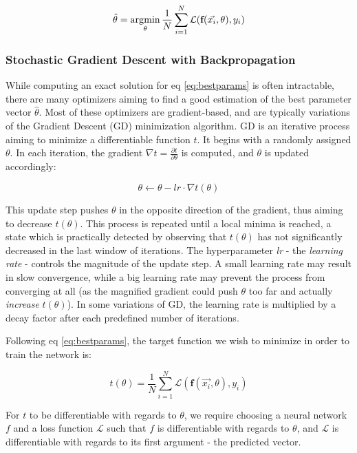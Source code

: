 \begin{equation}
\hat{\theta} = \operatorname*{\arg\!\min}_{\theta} \frac{1}{N}\sum_{i=1}^N \mathcal{L}(\textbf{f}(\vec{x_i}, \theta), y_i)
\label{eq:bestparams}    
\end{equation}

\subsubsection{Stochastic Gradient Descent with Backpropagation}
While computing an exact solution for eq \ref{eq:bestparams} is often intractable, there are many optimizers aiming to find a good estimation of the best parameter vector $\hat{\theta}$. Most of these optimizers are gradient-based, and are typically variations of the Gradient Descent (GD) minimization algorithm. GD is an iterative process aiming to minimize a differentiable function $t$. It begins with a randomly assigned $\theta$. In each iteration, the gradient $\nabla t = \frac{\partial t}{\partial \theta}$ is computed, and $\theta$ is updated accordingly:

$$ \theta \leftarrow \theta - \textit{lr} \cdot \nabla t(\theta) $$

This update step pushes $\theta$ in the opposite direction of the gradient, thus aiming to decrease $t(\theta)$. This process is repeated until a local minima is reached, a state which is practically detected by observing that $t(\theta)$ has not significantly decreased in the last window of iterations. The hyperparameter \textit{lr} - the \textit{learning rate} - controls the magnitude of the update step. A small learning rate may result in slow convergence, while a big learning rate may prevent the process from converging at all (as the magnified gradient could push $\theta$ too far and actually \emph{increase} $t(\theta)$). In some variations of GD, the learning rate is multiplied by a decay factor after each predefined number of iterations. 

Following eq \ref{eq:bestparams}, the target function we wish to minimize in order to train the network is:

$$ t(\theta) = \frac{1}{N}\sum_{i=1}^N \mathcal{L}(\textbf{f}(\vec{x_i}, \theta), y_i) $$

For $t$ to be differentiable with regards to $\theta$, we require choosing a neural network $f$ and a loss function $\mathcal{L}$ such that $f$ is differentiable with regards to $\theta$, and $\mathcal{L}$ is differentiable with regards to its first argument - the predicted vector.

